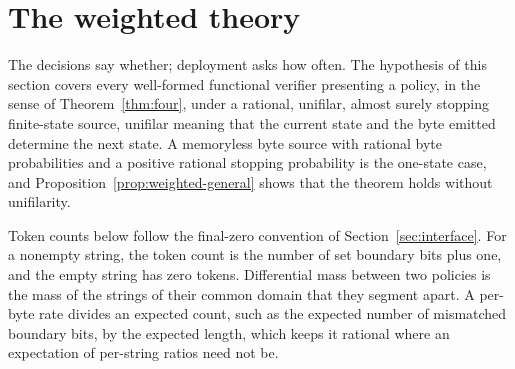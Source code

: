 \documentclass[11pt,a4paper]{article}
\theoremstyle{definition}
\theoremstyle{plain}
\begin{document}
\section{The weighted theory}\label{sec:weighted}


The decisions say whether; deployment asks how often. The hypothesis of this section covers every well-formed functional
verifier presenting a policy, in the sense of Theorem~\ref{thm:four}, under a rational, unifilar, almost surely stopping
finite-state source, unifilar meaning that the current state and the byte emitted determine the next state. A memoryless
byte source with rational byte probabilities and a positive rational stopping probability is the one-state case, and
Proposition~\ref{prop:weighted-general} shows that the theorem holds without unifilarity.

Token counts below follow the final-zero convention of Section~\ref{sec:interface}. For a nonempty string, the token
count is the number of set boundary bits plus one, and the empty string has zero tokens. Differential mass between two
policies is the mass of the strings of their common domain that they segment apart. A per-byte rate divides an expected
count, such as the expected number of mismatched boundary bits, by the expected length, which keeps it rational where an
expectation of per-string ratios need not be.
\end{document}
